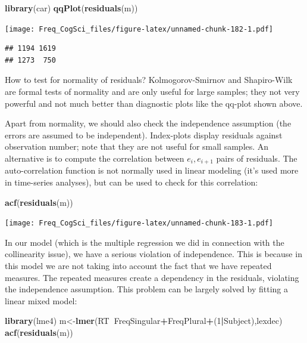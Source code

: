 \documentclass[12pt,]{krantz}
\newenvironment{Shaded}{\begin{snugshade}}{\end{snugshade}}
\newcommand{\DecValTok}[1]{\textcolor[rgb]{0.00,0.00,0.81}{#1}}
\newcommand{\KeywordTok}[1]{\textcolor[rgb]{0.13,0.29,0.53}{\textbf{#1}}}
\newcommand{\NormalTok}[1]{#1}
\newcommand{\OperatorTok}[1]{\textcolor[rgb]{0.81,0.36,0.00}{\textbf{#1}}}
\begin{document}
\begin{Shaded}
\begin{Highlighting}[]
\KeywordTok{library}\NormalTok{(car)}
\KeywordTok{qqPlot}\NormalTok{(}\KeywordTok{residuals}\NormalTok{(m))}
\end{Highlighting}
\end{Shaded}

\texttt{[image: Freq\_CogSci\_files/figure-latex/unnamed-chunk-182-1.pdf]}

\begin{verbatim}
## 1194 1619 
## 1273  750
\end{verbatim}

How to test for normality of residuals?
Kolmogorov-Smirnov and Shapiro-Wilk are formal tests of normality and are only useful for large samples; they not very powerful and not much better than diagnostic plots like the qq-plot shown above.

Apart from normality, we should also check the independence assumption (the errors are assumed to be independent). Index-plots display residuals against observation number; note that they are not useful for small samples. An alternative is to compute the correlation between \(e_i, e_{i+1}\) pairs of residuals. The auto-correlation function is not normally used in linear modeling (it's used more in time-series analyses), but can be used to check for this correlation:

\begin{Shaded}
\begin{Highlighting}[]
\KeywordTok{acf}\NormalTok{(}\KeywordTok{residuals}\NormalTok{(m))}
\end{Highlighting}
\end{Shaded}

\texttt{[image: Freq\_CogSci\_files/figure-latex/unnamed-chunk-183-1.pdf]}

In our model (which is the multiple regression we did in connection with the collinearity issue), we have a serious violation of independence. This is because in this model we are not taking into account the fact that we have repeated measures. The repeated measures create a dependency in the residuals, violating the independence assumption. This problem can be largely solved by fitting a linear mixed model:

\begin{Shaded}
\begin{Highlighting}[]
\KeywordTok{library}\NormalTok{(lme4)}
\NormalTok{m<-}\KeywordTok{lmer}\NormalTok{(RT}\OperatorTok{~}\NormalTok{FreqSingular}\OperatorTok{+}\NormalTok{FreqPlural}\OperatorTok{+}\NormalTok{(}\DecValTok{1}\OperatorTok{|}\NormalTok{Subject),lexdec)}
\KeywordTok{acf}\NormalTok{(}\KeywordTok{residuals}\NormalTok{(m))}
\end{Highlighting}
\end{Shaded}
\end{document}
